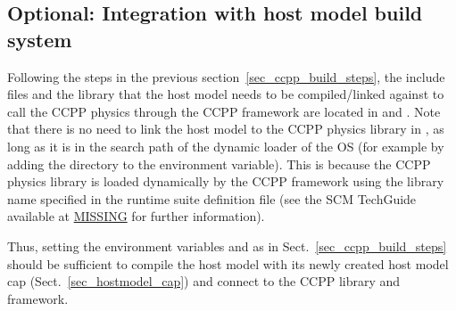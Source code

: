 \subsection{Optional: Integration with host model build system}
Following the steps in the previous section~\ref{sec_ccpp_build_steps}, the include files and the library  that the host model needs to be compiled/linked against to call the CCPP physics through the CCPP framework are located in  and . Note that there is no need to link the host model to the CCPP physics library in , as long as it is in the search path of the dynamic loader of the OS (for example by adding the directory  to the  environment variable). This is because the CCPP physics library is loaded dynamically by the CCPP framework using the library name specified in the runtime suite definition file (see the SCM TechGuide available at {\red\url{MISSING}} for further information).

Thus, setting the environment variables  and  as in Sect.~\ref{sec_ccpp_build_steps} should be sufficient to compile the host model with its newly created host model cap (Sect.~\ref{sec_hostmodel_cap}) and connect to the CCPP library and framework.
